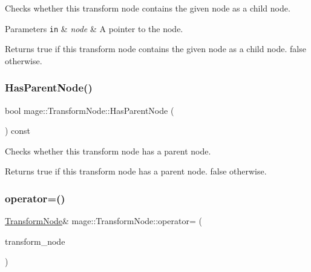 Checks whether this transform node contains the given node as a child node.


\begin{DoxyParams}[1]{Parameters}
\mbox{\tt in}  & {\em node} & A pointer to the node. \\
\hline
\end{DoxyParams}
\begin{DoxyReturn}{Returns}
{\ttfamily true} if this transform node contains the given node as a child node. {\ttfamily false} otherwise. 
\end{DoxyReturn}
\hypertarget{classmage_1_1_transform_node_a2ab56beff5c89ba174981d5c87af056e}{}\label{classmage_1_1_transform_node_a2ab56beff5c89ba174981d5c87af056e} 
\subsubsection{\texorpdfstring{Has\+Parent\+Node()}{HasParentNode()}}
{\footnotesize\ttfamily bool mage\+::\+Transform\+Node\+::\+Has\+Parent\+Node (\begin{DoxyParamCaption}{ }\end{DoxyParamCaption}) const\hspace{0.3cm}{\ttfamily [private]}}

Checks whether this transform node has a parent node.

\begin{DoxyReturn}{Returns}
{\ttfamily true} if this transform node has a parent node. {\ttfamily false} otherwise. 
\end{DoxyReturn}
\hypertarget{classmage_1_1_transform_node_a1514dd4dc3ca63725ead2a196b2c6c89}{}\label{classmage_1_1_transform_node_a1514dd4dc3ca63725ead2a196b2c6c89} 
\subsubsection{\texorpdfstring{operator=()}{operator=()}\hspace{0.1cm}{\footnotesize\ttfamily [1/2]}}
{\footnotesize\ttfamily \hyperlink{classmage_1_1_transform_node}{Transform\+Node}\& mage\+::\+Transform\+Node\+::operator= (\begin{DoxyParamCaption}\item[{const \hyperlink{classmage_1_1_transform_node}{Transform\+Node} \&}]{transform\+\_\+node }\end{DoxyParamCaption})\hspace{0.3cm}{\ttfamily [delete]}}

